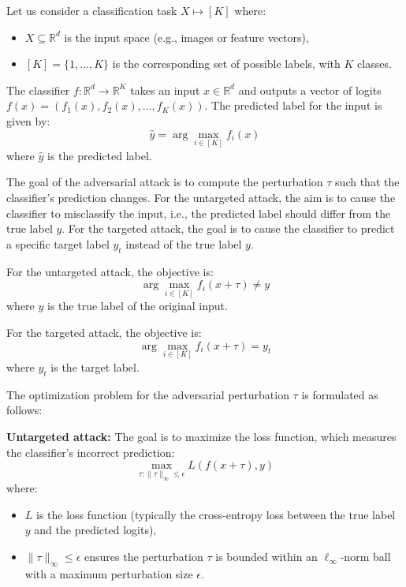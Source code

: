 
Let us consider a classification task \( X \mapsto [K] \) where:
\begin{itemize}
    \item \( X \subseteq \mathbb{R}^d \) is the input space (e.g., images or feature vectors),
    \item \( [K] = \{1, ..., K\} \) is the corresponding set of possible labels, with \( K \) classes.
\end{itemize}

The classifier \( f : \mathbb{R}^d \to \mathbb{R}^K \) takes an input \( x \in \mathbb{R}^d \) and outputs a vector of logits \( f(x) = (f_1(x), f_2(x), \dots, f_K(x)) \). The predicted label for the input is given by:
\[
\hat{y} = \arg \max_{i \in [K]} f_i(x)
\]
where \( \hat{y} \) is the predicted label.

The goal of the adversarial attack is to compute the perturbation \( \tau \) such that the classifier's prediction changes. For the untargeted attack, the aim is to cause the classifier to misclassify the input, i.e., the predicted label should differ from the true label \( y \). For the targeted attack, the goal is to cause the classifier to predict a specific target label \( y_t \) instead of the true label \( y \).

For the untargeted attack, the objective is:
\[
\arg \max_{i \in [K]} f_i(x + \tau) \neq y
\]
where \( y \) is the true label of the original input.

For the targeted attack, the objective is:
\[
\arg \max_{i \in [K]} f_i(x + \tau) = y_t
\]
where \( y_t \) is the target label.

The optimization problem for the adversarial perturbation \( \tau \) is formulated as follows:

\textbf{Untargeted attack:} The goal is to maximize the loss function, which measures the classifier's incorrect prediction:
\[
\max_{\tau: \|\tau\|_\infty \leq \epsilon} L(f(x + \tau), y)
\]
where:
\begin{itemize}
    \item \( L \) is the loss function (typically the cross-entropy loss between the true label \( y \) and the predicted logits),
    \item \( \|\tau\|_\infty \leq \epsilon \) ensures the perturbation \( \tau \) is bounded within an \( \ell_\infty \)-norm ball with a maximum perturbation size \( \epsilon \).
\end{itemize}

